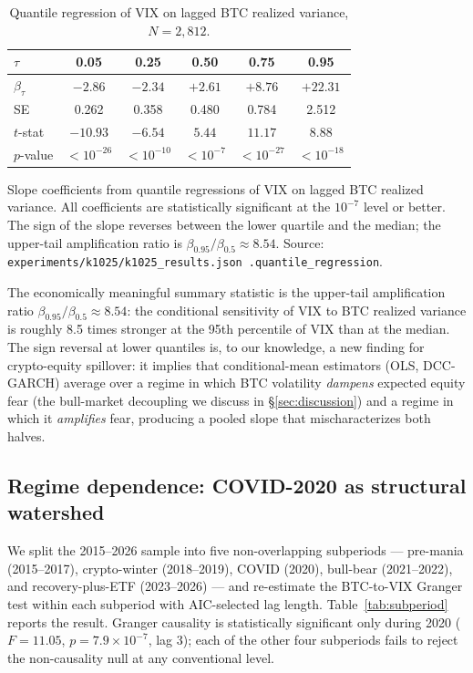 \documentclass[11pt,a4paper]{article}
\begin{document}
\begin{table}[H]
\centering
\caption{Quantile regression of VIX on lagged BTC realized variance, $N = 2{,}812$.}
\label{tab:qr}
\begin{tabular}{lccccc}
\toprule
$\tau$ & 0.05 & 0.25 & 0.50 & 0.75 & 0.95 \\
\midrule
$\beta_\tau$ & $-2.86$ & $-2.34$ & $+2.61$ & $+8.76$ & $+22.31$ \\
SE          & 0.262   & 0.358   & 0.480   & 0.784   & 2.512   \\
$t$-stat    & $-10.93$ & $-6.54$ & $5.44$  & $11.17$ & $8.88$  \\
$p$-value   & $< 10^{-26}$ & $< 10^{-10}$ & $< 10^{-7}$ & $< 10^{-27}$ & $< 10^{-18}$ \\
\bottomrule
\end{tabular}
\begin{flushleft}
\footnotesize Slope coefficients from quantile regressions of VIX on lagged BTC realized variance. All coefficients are statistically significant at the $10^{-7}$ level or better. The sign of the slope reverses between the lower quartile and the median; the upper-tail amplification ratio is $\beta_{0.95} / \beta_{0.5} \approx 8.54$. Source: \texttt{experiments/k1025/k1025\_results.json .quantile\_regression}.
\end{flushleft}
\end{table}

The economically meaningful summary statistic is the upper-tail amplification ratio $\beta_{0.95} / \beta_{0.5} \approx 8.54$: the conditional sensitivity of VIX to BTC realized variance is roughly 8.5 times stronger at the 95th percentile of VIX than at the median. The sign reversal at lower quantiles is, to our knowledge, a new finding for crypto-equity spillover: it implies that conditional-mean estimators (OLS, DCC-GARCH) average over a regime in which BTC volatility \emph{dampens} expected equity fear (the bull-market decoupling we discuss in \S\ref{sec:discussion}) and a regime in which it \emph{amplifies} fear, producing a pooled slope that mischaracterizes both halves.

\subsection{Regime dependence: COVID-2020 as structural watershed}
\label{subsec:r_regime}

We split the 2015--2026 sample into five non-overlapping subperiods --- pre-mania (2015--2017), crypto-winter (2018--2019), COVID (2020), bull-bear (2021--2022), and recovery-plus-ETF (2023--2026) --- and re-estimate the BTC-to-VIX Granger test within each subperiod with AIC-selected lag length. Table~\ref{tab:subperiod} reports the result. Granger causality is statistically significant only during 2020 ($F = 11.05$, $p = 7.9 \times 10^{-7}$, lag 3); each of the other four subperiods fails to reject the non-causality null at any conventional level.%
\end{document}
